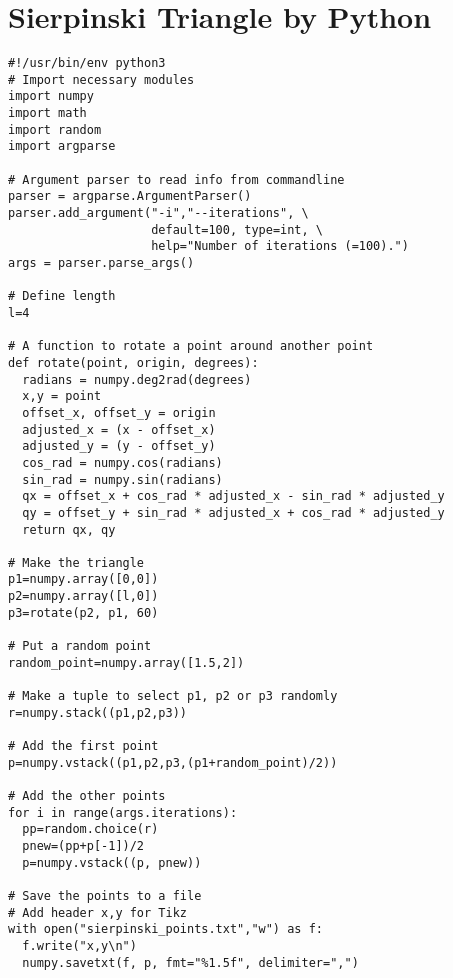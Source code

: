 \newpage
\section{Sierpinski Triangle by Python}
\label{app:sierpinski}
\begin{mdframed}
\small
\begin{verbatim}
#!/usr/bin/env python3
# Import necessary modules
import numpy
import math
import random
import argparse

# Argument parser to read info from commandline
parser = argparse.ArgumentParser()
parser.add_argument("-i","--iterations", \
                    default=100, type=int, \
                    help="Number of iterations (=100).")
args = parser.parse_args()

# Define length
l=4

# A function to rotate a point around another point
def rotate(point, origin, degrees):
  radians = numpy.deg2rad(degrees)
  x,y = point
  offset_x, offset_y = origin
  adjusted_x = (x - offset_x)
  adjusted_y = (y - offset_y)
  cos_rad = numpy.cos(radians)
  sin_rad = numpy.sin(radians)
  qx = offset_x + cos_rad * adjusted_x - sin_rad * adjusted_y
  qy = offset_y + sin_rad * adjusted_x + cos_rad * adjusted_y
  return qx, qy

# Make the triangle
p1=numpy.array([0,0])
p2=numpy.array([l,0])
p3=rotate(p2, p1, 60)

# Put a random point
random_point=numpy.array([1.5,2])

# Make a tuple to select p1, p2 or p3 randomly
r=numpy.stack((p1,p2,p3))

# Add the first point
p=numpy.vstack((p1,p2,p3,(p1+random_point)/2))

# Add the other points
for i in range(args.iterations):
  pp=random.choice(r)
  pnew=(pp+p[-1])/2
  p=numpy.vstack((p, pnew))

# Save the points to a file
# Add header x,y for Tikz
with open("sierpinski_points.txt","w") as f:
  f.write("x,y\n")
  numpy.savetxt(f, p, fmt="%1.5f", delimiter=",")
\end{verbatim}
\end{mdframed}
